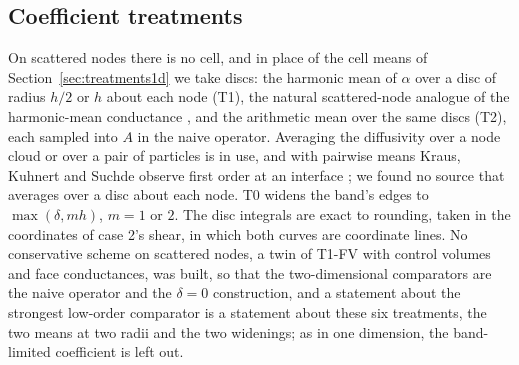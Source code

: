 \documentclass[11pt]{amsart}
\theoremstyle{definition}
\theoremstyle{remark}
\begin{document}
\subsection{Coefficient treatments}
\label{sec:treatments2d}
On scattered nodes there is no cell, and in place of the cell means of
Section~\ref{sec:treatments1d} we take discs: the harmonic mean of $\alpha$ over a disc of radius $h/2$ or $h$
about each node (T1), the natural scattered-node analogue of the
harmonic-mean conductance \cite{Patankar1980}, and the arithmetic mean over
the same discs (T2), each sampled into $A$ in the naive operator. Averaging the diffusivity
over a node cloud \cite{KrausEtAl2023} or over a pair of particles
\cite{ClearyMonaghan1999} is in use, and with pairwise means Kraus, Kuhnert
and Suchde observe first order at an interface
\cite{KrausKuhnertSuchde2025}; we found no source that averages over a disc
about each node. T0 widens the band's edges to $\max(\delta, mh)$, $m = 1$
or $2$. The disc integrals are exact to rounding, taken in the coordinates of
case 2's shear, in which both curves are coordinate lines. No conservative
scheme on scattered nodes, a twin of T1-FV with control volumes and face
conductances, was built, so that the two-dimensional comparators are the
naive operator and the $\delta = 0$ construction, and a statement about the
strongest low-order comparator is a statement about these six
treatments, the two means at two radii and the two widenings; as in one
dimension, the band-limited coefficient is left out.
\end{document}
